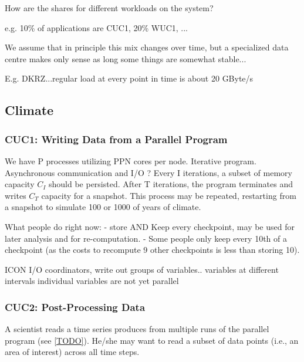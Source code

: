 \documentclass{../../template/esiwace-report}
\begin{document}
How are the shares for different workloads on the system?

e.g. 10\% of applications are CUC1, 20\% WUC1, ...


We assume that in principle this mix changes over time, but a specialized data centre makes only sense as long some things are somewhat stable...



E.g. DKRZ...regular load at every point in time is about 20 GByte/s 








\subsection{Climate}

\subsubsection{CUC1: Writing Data from a Parallel Program}

We have P processes utilizing PPN cores per node.
Iterative program.
Asynchronous communication and I/O ?
Every I iterations, a subset of memory capacity $C_I$ should be persisted.
After T iterations, the program terminates and writes $C_T$ capacity for a snapshot.
This process may be repeated, restarting from a snapshot to simulate 100 or 1000 of years of climate.

What people do right now:
- store AND Keep every checkpoint, may be used for later analysis and for re-computation.
- Some people only keep every 10th of a checkpoint (as the costs to recompute 9 other checkpoints is less than storing 10).




ICON
	I/O coordinators, write out groups of variables..
	variables at different intervals
	individual variables are not yet parallel




\subsubsection{CUC2: Post-Processing Data}

A scientist reads a time series produces from multiple runs of the parallel program (see \ref{TODO}).
He/she may want to read a subset of data points (i.e., an area of interest) across all time steps.
\end{document}
